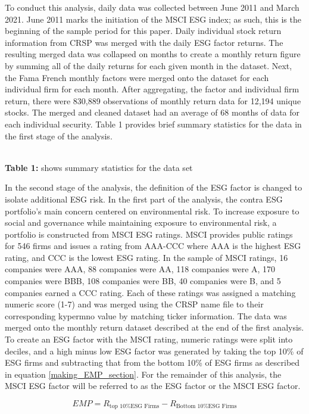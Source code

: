 To conduct this analysis, daily data was collected between June 2011 and March 2021.  June 2011 marks the initiation of the MSCI ESG index; as such, this is the beginning of the sample period for this paper. Daily individual stock return information from CRSP was merged with the daily ESG factor returns. The resulting merged data was collapsed on months to create a monthly return figure by summing all of the daily returns for each given month in the dataset. Next, the Fama French monthly factors were merged onto the dataset for each individual firm for each month. After aggregating, the factor and individual firm return, there were 830,889 observations of monthly return data for 12,194 unique stocks. The merged and cleaned dataset had an average of 68 months of data for each individual security. Table 1 provides brief summary statistics for the data in the first stage of the analysis.

\begin{center}
    \paperspacingnarrow
    \\
    \textbf{Table 1:} shows summary statistics for the data set
    \paperspacingwide
\end{center}

In the second stage of the analysis, the definition of the ESG factor is changed to isolate additional ESG risk. In the first part of the analysis, the contra ESG portfolio's main concern centered on environmental risk. To increase exposure to social and governance while maintaining exposure to environmental risk, a portfolio is constructed from MSCI ESG ratings. MSCI provides public ratings for 546 firms and issues a rating from AAA-CCC where AAA is the highest ESG rating, and CCC is the lowest ESG rating. In the sample of MSCI ratings, 16 companies were AAA, 88 companies were AA, 118 companies were A, 170 companies were BBB, 108 companies were BB, 40 companies were B, and 5 companies earned a CCC rating.  Each of these ratings was assigned a matching numeric score (1-7) and was merged using the CRSP name file to their corresponding kypermno value by matching ticker information. The data was merged onto the monthly return dataset described at the end of the first analysis. To create an ESG factor with the MSCI rating, numeric ratings were split into deciles, and a high minus low  ESG factor was generated by taking the top 10\% of ESG firms and subtracting that from the bottom 10\%  of ESG firms as described in equation \eqref{making_EMP_section}. For the remainder of this analysis, the MSCI ESG factor will be referred to as the ESG factor or the MSCI ESG factor. 

\begin{equation}
    \label{making_EMP_section}
    EMP = R_{\text{top 10\% ESG Firms}}- R_{\text{Bottom 10\% ESG Firms}}
\end{equation}

